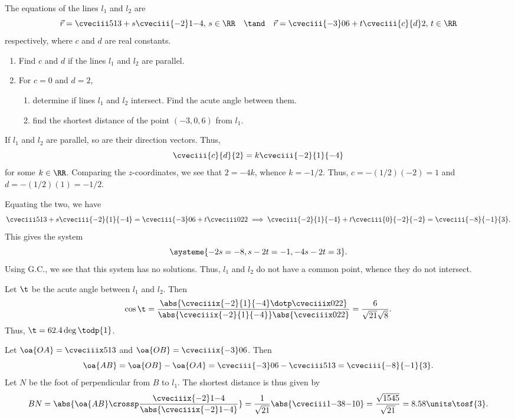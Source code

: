\begin{problem}
    The equations of the lines $l_1$ and $l_2$ are \[\vec r = \cveciii513 + s\cveciii{-2}1{-4}, \, s \in \RR \quad \tand \quad \vec r = \cveciii{-3}06 + t\cveciii{c}{d}2, \, t \in \RR\] respectively, where $c$ and $d$ are real constants.

    \begin{enumerate}
        \item Find $c$ and $d$ if the lines $l_1$ and $l_2$ are parallel.
        \item For $c = 0$ and $d = 2$,
        \begin{enumerate}
            \item determine if lines $l_1$ and $l_2$ intersect. Find the acute angle between them.
            \item find the shortest distance of the point $(-3, 0, 6)$ from $l_1$.
        \end{enumerate}
    \end{enumerate}
\end{problem}
\begin{solution}
    \begin{ppart}
        If $l_1$ and $l_2$ are parallel, so are their direction vectors. Thus, \[\cveciii{c}{d}{2} = k\cveciii{-2}{1}{-4}\] for some $k \in \RR$. Comparing the $z$-coordinates, we see that $2 = -4k$, whence $k = -1/2$. Thus, $c = -(1/2)(-2) = 1$ and $d = -(1/2)(1) = -1/2$.
    \end{ppart}
    \begin{ppart}
        \begin{psubpart}
            Equating the two, we have \[\cveciii513 + s\cveciii{-2}{1}{-4} = \cveciii{-3}06 + t \cveciii022 \implies \cveciii{-2}{1}{-4} + t\cveciii{0}{-2}{-2} = \cveciii{-8}{-1}{3}.\] This gives the system \[\systeme{-2s = -8, s - 2t = -1, -4s - 2t = 3}.\] Using G.C., we see that this system has no solutions. Thus, $l_1$ and $l_2$ do not have a common point, whence they do not intersect.            
            
            Let $\t$ be the acute angle between $l_1$ and $l_2$. Then \[\cos \t = \frac{\abs{\cveciiix{-2}{1}{-4} \dotp \cveciiix022}}{\abs{\cveciiix{-2}{1}{-4}} \abs{\cveciiix022}} = \frac{6}{\sqrt{21} \sqrt{8}}.\] Thus, $\t = 62.4\deg \todp{1}$.
        \end{psubpart}
        \begin{psubpart}
            Let $\oa{OA} = \cveciiix513$ and $\oa{OB} = \cveciiix{-3}06$. Then \[\oa{AB} = \oa{OB} - \oa{OA} = \cveciii{-3}06 - \cveciii513 = \cveciii{-8}{-1}{3}.\] Let $N$ be the foot of perpendicular from $B$ to $l_1$. The shortest distance is thus given by \[BN = \abs{\oa{AB} \crossp \frac{\cveciiix{-2}1{-4}}{\abs{\cveciiix{-2}1{-4}}}} = \frac1{\sqrt{21}} \abs{\cveciii1{-38}{-10}} = \frac{\sqrt{1545}}{\sqrt{21}} = 8.58 \units \tosf{3}.\]
        \end{psubpart}
    \end{ppart}
\end{solution}

